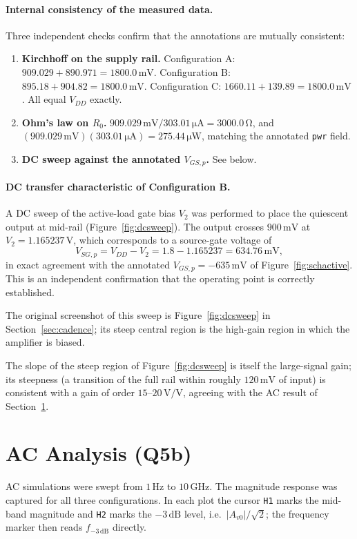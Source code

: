 \documentclass[12pt,a4paper]{article}
\newcommand{\U}[1]{\,\mathrm{#1}}
\begin{document}
\paragraph{Internal consistency of the measured data.}
Three independent checks confirm that the annotations are mutually consistent:
\begin{enumerate}[leftmargin=2.0em,itemsep=1pt]
  \item \textbf{Kirchhoff on the supply rail.}
        Configuration A: $909.029 + 890.971 = 1800.0\U{mV}$.
        Configuration B: $895.18 + 904.82 = 1800.0\U{mV}$.
        Configuration C: $1660.11 + 139.89 = 1800.0\U{mV}$. All equal $V_{DD}$ exactly.
  \item \textbf{Ohm's law on $R_0$.}
        $909.029\U{mV} / 303.01\U{\mu A} = 3000.0\U{\Omega}$, and
        $(909.029\U{mV})(303.01\U{\mu A}) = 275.44\U{\mu W}$, matching the
        annotated \texttt{pwr} field.
  \item \textbf{DC sweep against the annotated $V_{GS,p}$.} See below.
\end{enumerate}

\paragraph{DC transfer characteristic of Configuration B.}
A DC sweep of the active-load gate bias $V_2$ was performed to place the
quiescent output at mid-rail (Figure~\ref{fig:dcsweep}). The output crosses
$900\U{mV}$ at $V_2 = 1.165237\U{V}$, which corresponds to a source-gate
voltage of
\[
V_{SG,p} = V_{DD}-V_2 = 1.8 - 1.165237 = 634.76\U{mV},
\]
in exact agreement with the annotated $V_{GS,p} = -635\U{mV}$ of
Figure~\ref{fig:schactive}. This is an independent confirmation that the
operating point is correctly established.

The original screenshot of this sweep is Figure~\ref{fig:dcsweep} in
Section~\ref{sec:cadence}; its steep central region is the high-gain region in
which the amplifier is biased.

The slope of the steep region of Figure~\ref{fig:dcsweep} is itself the
large-signal gain; its steepness (a transition of the full rail within roughly
$120\U{mV}$ of input) is consistent with a gain of order $15$--$20\U{V/V}$,
agreeing with the AC result of Section~\ref{sec:ac}.

\FloatBarrier

\section{AC Analysis (Q5b)}\label{sec:ac}
AC simulations were swept from $1\U{Hz}$ to $10\U{GHz}$. The magnitude
response was captured for all three configurations. In each plot the cursor
\texttt{H1} marks the mid-band magnitude and \texttt{H2} marks the
$-3\U{dB}$ level, i.e.\ $|A_{v0}|/\sqrt{2}$; the frequency marker then reads
$f_{-3\U{dB}}$ directly.
\end{document}
